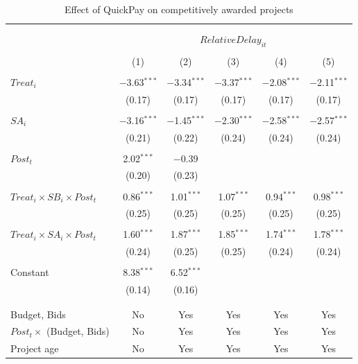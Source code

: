 \documentclass[
]{article}
\begin{document}
\begin{table}[H] \centering 
  \caption{Effect of QuickPay on competitively awarded projects} 
  \label{} 
\small 
\begin{tabular}{@{\extracolsep{-2pt}}lccccc} 
\\[-1.8ex]\hline 
\hline \\[-1.8ex] 
\\[-1.8ex] & \multicolumn{5}{c}{$RelativeDelay_{it}$  } \\ 
\\[-1.8ex] & (1) & (2) & (3) & (4) & (5)\\ 
\hline \\[-1.8ex] 
 $Treat_i$ & $-$3.63$^{***}$ & $-$3.34$^{***}$ & $-$3.37$^{***}$ & $-$2.08$^{***}$ & $-$2.11$^{***}$ \\ 
  & (0.17) & (0.17) & (0.17) & (0.17) & (0.17) \\ 
  & & & & & \\ 
 $SA_i$ & $-$3.16$^{***}$ & $-$1.45$^{***}$ & $-$2.30$^{***}$ & $-$2.58$^{***}$ & $-$2.57$^{***}$ \\ 
  & (0.21) & (0.22) & (0.24) & (0.24) & (0.24) \\ 
  & & & & & \\ 
 $Post_t$ & 2.02$^{***}$ & $-$0.39 &  &  &  \\ 
  & (0.20) & (0.23) &  &  &  \\ 
  & & & & & \\ 
 $Treat_i \times SB_i \times Post_t$ & 0.86$^{***}$ & 1.01$^{***}$ & 1.07$^{***}$ & 0.94$^{***}$ & 0.98$^{***}$ \\ 
  & (0.25) & (0.25) & (0.25) & (0.25) & (0.25) \\ 
  & & & & & \\ 
 $Treat_i \times SA_i \times Post_t$ & 1.60$^{***}$ & 1.87$^{***}$ & 1.85$^{***}$ & 1.74$^{***}$ & 1.78$^{***}$ \\ 
  & (0.24) & (0.25) & (0.25) & (0.24) & (0.24) \\ 
  & & & & & \\ 
 Constant & 8.38$^{***}$ & 6.52$^{***}$ &  &  &  \\ 
  & (0.14) & (0.16) &  &  &  \\ 
  & & & & & \\ 
\hline \\[-1.8ex] 
Budget, Bids & No & Yes & Yes & Yes & Yes \\ 
$Post_t \times $  (Budget, Bids) & No & Yes & Yes & Yes & Yes \\ 
Project age & No & Yes & Yes & Yes & Yes \\ 

\end{tabular}
\end{table}
\end{document}
